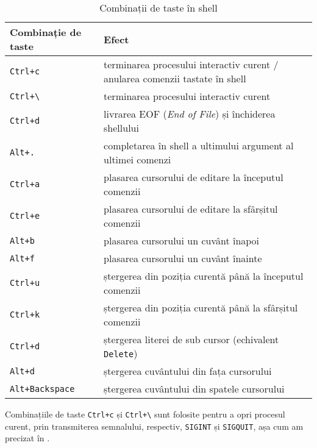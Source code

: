 \begin{table}[!htb]
  \begin{center}
    \begin{tabular}{ p{} p{} }
      \toprule
        \textbf{Combinație de taste} &
        \textbf{Efect} \\
      \midrule
        \texttt{Ctrl+c} &
        terminarea procesului interactiv curent / anularea comenzii tastate în shell \\
      \midrule
        \texttt{Ctrl+\textbackslash{}} &
        terminarea procesului interactiv curent \\
      \midrule
        \texttt{Ctrl+d} &
        livrarea EOF (\textit{End of File}) și închiderea shellului \\
      \midrule
        \texttt{Alt+.} &
        completarea în shell a ultimului argument al ultimei comenzi \\
      \midrule
        \texttt{Ctrl+a} &
        plasarea cursorului de editare la începutul comenzii \\
      \midrule
        \texttt{Ctrl+e} &
        plasarea cursorului de editare la sfârșitul comenzii \\
      \midrule
        \texttt{Alt+b} &
        plasarea cursorului un cuvânt înapoi \\
      \midrule
        \texttt{Alt+f} &
        plasarea cursorului un cuvânt înainte \\
      \midrule
        \texttt{Ctrl+u} &
        ștergerea din poziția curentă până la începutul comenzii \\
      \midrule
        \texttt{Ctrl+k} &
        ștergerea din poziția curentă până la sfârșitul comenzii \\
      \midrule
        \texttt{Ctrl+d} &
        ștergerea literei de sub cursor (echivalent \texttt{Delete}) \\
      \midrule
        \texttt{Alt+d} &
        ștergerea cuvântului din fața cursorului \\
      \midrule
        \texttt{Alt+Backspace} &
        ștergerea cuvântului din spatele cursorului \\
      \bottomrule
    \end{tabular}
  \end{center}
  \caption{Combinații de taste în shell}
  \label{tab:cli:key-bindings}
\end{table}

Combinațiile de taste \texttt{Ctrl+c} și \texttt{Ctrl+\textbackslash{}} sunt folosite pentru a opri procesul curent, prin transmiterea semnalului, respectiv, \texttt{SIGINT} și \texttt{SIGQUIT}, așa cum am precizat în \label{sec:process:signal}.

